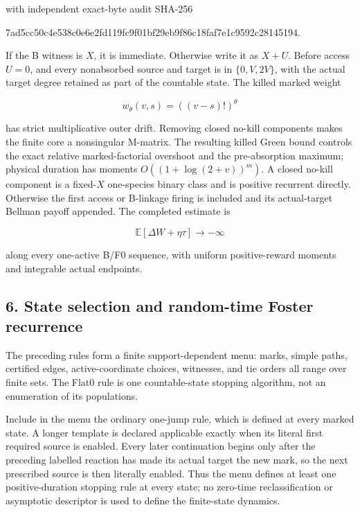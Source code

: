 with independent exact-byte audit SHA-256

\begin{CodeBlock}
7ad5cc50c4e538c0e6e2fd119fc9f01bf29eb9f86c18faf7e1c9592c28145194.
\end{CodeBlock}

If the B witness is \(X\), it is immediate. Otherwise write it as
\(X+U\). Before access \(U=0\), and every nonabsorbed source and target
is in \(\{0,V,2V\}\), with the actual target degree retained as part of
the countable state. The killed marked weight

\[
                  w_\theta(v,s)=((v-s)!)^\theta       \tag{5.7}
\]

has strict multiplicative outer drift. Removing closed no-kill
components makes the finite core a nonsingular M-matrix. The resulting
killed Green bound controls the exact relative marked-factorial
overshoot and the pre-absorption maximum; physical duration has moments
\(O((1+\log(2+v))^m)\). A closed no-kill component is a fixed-\(X\)
one-species binary class and is positive recurrent directly. Otherwise
the first access or B-linkage firing is included and its actual-target
Bellman payoff appended. The completed estimate is

\[
 \mathbb E[\Delta W+\eta\tau]\longrightarrow-\infty \tag{5.8}
\]

along every one-active B/F0 sequence, with uniform positive-reward
moments and integrable actual endpoints.

\subsection{6. State selection and random-time Foster
recurrence}

The preceding rules form a finite support-dependent menu: marks, simple
paths, certified edges, active-coordinate choices, witnesses, and tie
orders all range over finite sets. The Flat0 rule is one countable-state
stopping algorithm, not an enumeration of its populations.

Include in the menu the ordinary one-jump rule, which is defined at
every marked state. A longer template is declared applicable exactly
when its literal first required source is enabled. Every later
continuation begins only after the preceding labelled reaction has made
its actual target the new mark, so the next prescribed source is then
literally enabled. Thus the menu defines at least one positive-duration
stopping rule at every state; no zero-time reclassification or
asymptotic descriptor is used to define the finite-state dynamics.

